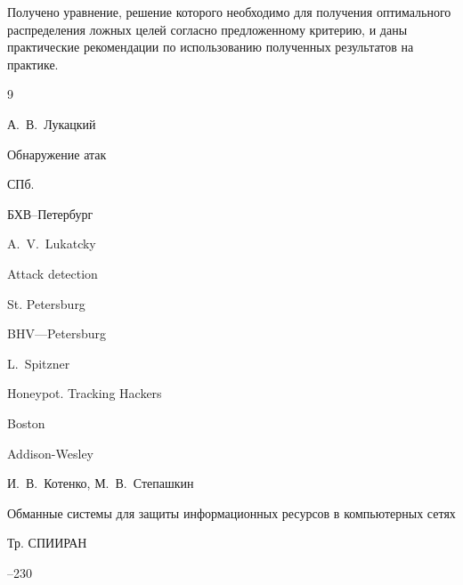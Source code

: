Получено уравнение, решение которого необходимо для получения оптимального распределения ложных целей согласно предложенному критерию, и даны практические рекомендации по использованию полученных результатов на практике.





\begin{thebibliography}{9}




\by А.~В.~Лукацкий

\book Обнаружение атак

\publaddr СПб.

\publ БХВ--Петербург



\misctransl

\by A.~V.~Lukatcky

\book Attack detection

\publaddr St. Petersburg

\publ BHV—Petersburg












\by L.~Spitzner

\book Honeypot. Tracking Hackers

\publaddr Boston

\publ Addison-Wesley






\by И.~В.~Котенко, М.~В.~Степашкин

\paper Обманные системы для защиты информационных ресурсов в компьютерных сетях

\jour Тр. СПИИРАН




--230


\misctransl


\end{thebibliography}
